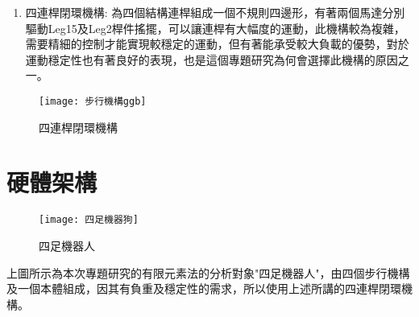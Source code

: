 \begin{enumerate}
\item 四連桿閉環機構:
為四個結構連桿組成一個不規則四邊形，有著兩個馬達分別驅動Leg15及Leg2桿件搖擺，可以讓連桿有大幅度的運動，此機構較為複雜，需要精細的控制才能實現較穩定的運動，但有著能承受較大負載的優勢，對於運動穩定性也有著良好的表現，也是這個專題研究為何會選擇此機構的原因之一。
\end{enumerate}

\begin{figure}[hbt!]
\begin{center}
\texttt{[image: 步行機構ggb]}
\caption{\Large 四連桿閉環機構}\label{步行機構ggb}
\end{center}
\end{figure}
\newpage

\section{硬體架構}

\begin{figure}[hbt!]
\begin{center}
\texttt{[image: 四足機器狗]}
\caption{\Large 四足機器人}\label{四足機器狗}
\end{center}
\end{figure}
上圖所示為本次專題研究的有限元素法的分析對象"四足機器人"，由四個步行機構及一個本體組成，因其有負重及穩定性的需求，所以使用上述所講的四連桿閉環機構。\
\newpage

